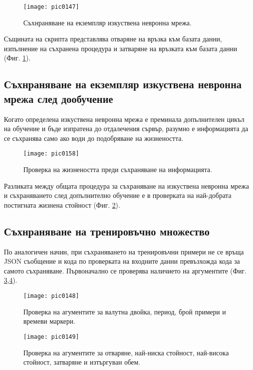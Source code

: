 \begin{figure}[h]
  \centering
  \texttt{[image: pic0147]}
  \caption{Съхнраняване на екземпляр изкуствена невронна мрежа.}
\label{fig:pic0147}
\end{figure}
\FloatBarrier

Същината на скрипта представлява отваряне на връзка към базата данни, изпълнение на съхранена процедура и затваряне на връзката към базата данни (Фиг. \ref{fig:pic0147}).

\subsection{Съхнраняване на екземпляр изкуствена невронна мрежа след дообучение}

Когато определена изкуствена невронна мрежа е преминала допълнителен цикъл на обучение и бъде изпратена до отдалечения сървър, разумно е информацията да се съхранява само ако води до подобряване на жизнеността. 

\begin{figure}[h]
  \centering
  \texttt{[image: pic0158]}
  \caption{Проверка на жизнеността преди съхраняване на информацията.}
\label{fig:pic0158}
\end{figure}
\FloatBarrier

Разликата между общата процедура за съхраняване на изкуствена невронна мрежа и съхраняването след допълнително обучение е в проверката на най-добрата постигната жизнена стойност (Фиг. \ref{fig:pic0158}).

\subsection{Съхнраняване на тренировъчно множество}

По аналогичен начин, при съхраняването на тренировъчни примери не се връща JSON съобщение и кода по проверката на входните данни превъзхожда кода за самото съхраняване. Първоначално се проверява наличието на аргументите (Фиг. \ref{fig:pic0148},\ref{fig:pic0149}).

\begin{figure}[h]
  \centering
  \texttt{[image: pic0148]}
  \caption{Проверка на агументите за валутна двойка, период, брой примери и времеви маркери.}
\label{fig:pic0148}
\end{figure}
\FloatBarrier

\begin{figure}[h]
  \centering
  \texttt{[image: pic0149]}
  \caption{Проверка на агументите за отваряне, най-ниска стойност, най-висока стойност, затваряне и изтъргуван обем.}
\label{fig:pic0149}
\end{figure}
\FloatBarrier

